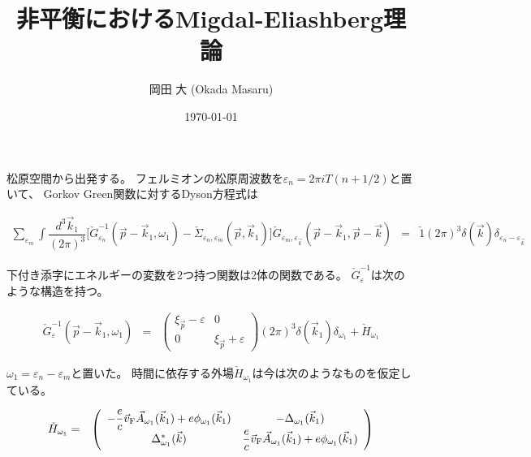 \documentclass[uplatex,a4j,12pt,dvipdfmx]{jsarticle}
\title{非平衡におけるMigdal-Eliashberg理論}
\author{岡田 大 (Okada Masaru)}
\date{\today}
\begin{document}
\maketitle

松原空間から出発する。
フェルミオンの松原周波数を$\varepsilon_{n} = 2 \pi i T (n + 1/2)$と置いて、
Gorkov Green関数に対するDyson方程式は

\begin{eqnarray}
	\sum_{\varepsilon_{m}}
	\int \dfrac{ d^{3} \vec{k}_{1} }{ (2 \pi)^{3} }
	\Big[ \check{G}^{-1}_{\varepsilon_{n}} (\vec{p} - \vec{k}_{1} , \omega_{1} ) - \check{\mathit{\Sigma}}_{\varepsilon_{n},\varepsilon_{m}}(\vec{p},\vec{k}_{1}) \Big]
	\check{G}_{\varepsilon_{m},\varepsilon_{\vec{k}}} ( \vec{p} - \vec{k}_{1} , \vec{p} - \vec{k} )
	&=&
	\check{1} (2 \pi)^{3} \delta(\vec{k}) \delta_{\varepsilon_{n} - \varepsilon_{\vec{k}}}
	\label{eqn:dysonone}
\end{eqnarray}

下付き添字にエネルギーの変数を2つ持つ関数は2体の関数である。
$\check{G}^{-1}_{\varepsilon}$は次のような構造を持つ。

\begin{eqnarray}
	\check{G}^{-1}_{\varepsilon}(\vec{p}-\vec{k}_{1},\omega_{1})
	&=&
	\left(
	\begin{array}{cc}
		\xi_{\vec{p}} - \varepsilon & 0
		\\
		0                           & \xi_{\vec{p}} + \varepsilon
	\end{array}
	\right)
	(2 \pi)^{3}
	\delta(\vec{k}_{1})
	\delta_{\omega_{1}}
	+
	\check{H}_{\omega_{1}}
\end{eqnarray}

$\omega_{1} = \varepsilon_{n} - \varepsilon_{m}$と置いた。
時間に依存する外場$\check{H}_{\omega_{1}}$は今は次のようなものを仮定している。

\begin{eqnarray}
	\check{H}_{\omega_{1}}
	&=&
	\left(
	\begin{array}{cc}
			- \dfrac{e}{c} \vec{v}_{\rm F} \vec{A}_{\omega_{1}} (\vec{k}_{1}) + e \phi_{\omega_{1}}(\vec{k}_{1}) & - \Delta_{\omega_{1}} (\vec{k}_{1})
			\\
			\Delta^{*}_{\omega_{1}} (\vec{k})                                                                    & \dfrac{e}{c} \vec{v}_{\rm F} \vec{A}_{\omega_{1}} (\vec{k}_{1}) + e \phi_{\omega_{1}} (\vec{k}_{1})
		\end{array}
	\right)
\end{eqnarray}
\end{document}
